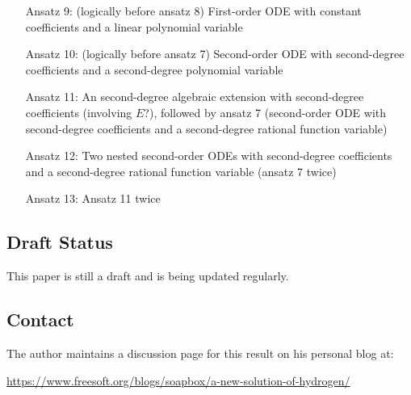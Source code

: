 \documentclass{article}
\begin{document}
\begin{itemize}
\item[Ansatz 9:] (logically before ansatz 8) First-order ODE with constant coefficients and a linear polynomial variable

\item[Ansatz 10:] (logically before ansatz 7) Second-order ODE with second-degree coefficients and a second-degree polynomial variable

\item[Ansatz 11:] An second-degree algebraic extension with second-degree coefficients (involving $E$?),
followed by ansatz 7 (second-order ODE with second-degree coefficients and a second-degree rational function variable)

\item[Ansatz 12:] Two nested second-order ODEs with second-degree coefficients and a second-degree rational function variable (ansatz 7 twice)

\item[Ansatz 13:] Ansatz 11 twice

\end{itemize}

\subsection*{Draft Status}

This paper is still a draft and is being updated regularly.

\subsection*{Contact}

The author maintains a discussion page for this result on his personal blog at:

\begin{center}
\small
\url{https://www.freesoft.org/blogs/soapbox/a-new-solution-of-hydrogen/}
\end{center}
\end{document}
